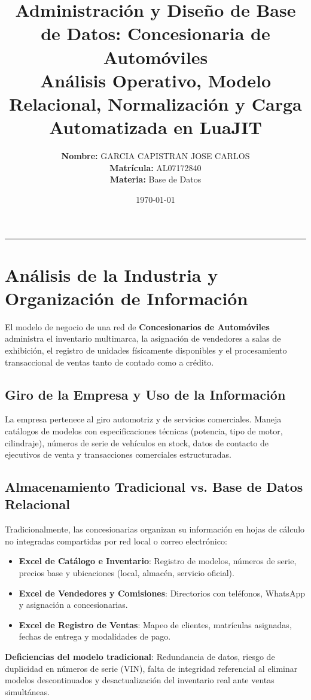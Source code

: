 \documentclass[11pt,a4paper]{article}
\title{\textbf{Administración y Diseño de Base de Datos: Concesionaria de Automóviles}\\ \large Análisis Operativo, Modelo Relacional, Normalización y Carga Automatizada en LuaJIT}
\author{\textbf{Nombre:} GARCIA CAPISTRAN JOSE CARLOS \\ \textbf{Matrícula:} AL07172840 \\ \textbf{Materia:} Base de Datos}
\date{\today}
\begin{document}
\maketitle
\thispagestyle{fancy}

\hrule
\vspace{0.5cm}

\section{Análisis de la Industria y Organización de Información}

El modelo de negocio de una red de \textbf{Concesionarios de Automóviles} administra el inventario multimarca, la asignación de vendedores a salas de exhibición, el registro de unidades físicamente disponibles y el procesamiento transaccional de ventas tanto de contado como a crédito.

\subsection{Giro de la Empresa y Uso de la Información}
La empresa pertenece al giro automotriz y de servicios comerciales. Maneja catálogos de modelos con especificaciones técnicas (potencia, tipo de motor, cilindraje), números de serie de vehículos en stock, datos de contacto de ejecutivos de venta y transacciones comerciales estructuradas.

\subsection{Almacenamiento Tradicional vs. Base de Datos Relacional}
Tradicionalmente, las concesionarias organizan su información en hojas de cálculo no integradas compartidas por red local o correo electrónico:
\begin{itemize}
    \item \textbf{Excel de Catálogo e Inventario}: Registro de modelos, números de serie, precios base y ubicaciones (local, almacén, servicio oficial).
    \item \textbf{Excel de Vendedores y Comisiones}: Directorios con teléfonos, WhatsApp y asignación a concesionarias.
    \item \textbf{Excel de Registro de Ventas}: Mapeo de clientes, matrículas asignadas, fechas de entrega y modalidades de pago.
\end{itemize}

\textbf{Deficiencias del modelo tradicional}: Redundancia de datos, riesgo de duplicidad en números de serie (VIN), falta de integridad referencial al eliminar modelos descontinuados y desactualización del inventario real ante ventas simultáneas.
\end{document}
